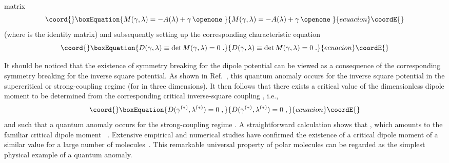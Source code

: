 \documentclass[a4paper,twocolumn,
showpacs,amssymb,aps,prl,superscriptaddress]{revtex4}%
\begin{document}
matrix
\begin{equation}\coord{}\boxEquation{
M(\gamma, \lambda) = - A(\lambda) + \gamma  \, \openone \; 
}{
M(\gamma, \lambda) = - A(\lambda) + \gamma  \, \openone \; 
}{ecuacion}\coordE{}\end{equation}
(where \myHighlight{$\openone$}\coordHE{} is the identity matrix)
and subsequently setting up
the corresponding characteristic 
equation~\cite{lev:67,bro:67,cra:67}
\begin{equation}\coord{}\boxEquation{
D(\gamma, \lambda) \equiv \det M (\gamma,\lambda) 
= 0 
\; .
 \label{eq:determinant}
}{
D(\gamma, \lambda) \equiv \det M (\gamma,\lambda) 
= 0 
\; .
 }{ecuacion}\coordE{}\end{equation}

It should be noticed that the existence of symmetry breaking for
the dipole potential can be
viewed as a consequence of the corresponding symmetry breaking for
the inverse square potential.
As shown in Ref.~\cite{cam:00}, this quantum anomaly 
occurs for the inverse square potential in the supercritical
or strong-coupling regime \coordHE{}
(for \coordHE{} in three dimensions).
It then follows that there exists
a critical value \myHighlight{$\lambda^{(*)}$}\coordHE{}
of the dimensionless dipole moment 
to be determined from the corresponding critical inverse-square coupling
\coordHE{}, i.e.,
\begin{equation}\coord{}\boxEquation{
D(\gamma^{(*)},\lambda^{(*)}) =0 \; ,
\label{eq:critical_characteristic_equation}
}{
D(\gamma^{(*)},\lambda^{(*)}) =0 \; ,
}{ecuacion}\coordE{}\end{equation}
and such that a quantum anomaly occurs for 
the strong-coupling regime \myHighlight{$ \lambda \geq \lambda^{(*)}$}\coordHE{}.
A straightforward calculation
shows that 
\coordHE{},
which amounts to the familiar critical dipole moment \coordHE{}~\cite{fer:47,wig:49,lev:67,bro:67,cra:67}. Extensive
empirical and numerical studies have confirmed the existence of a
critical dipole moment of a similar value for a large number of
molecules~\cite{mea:84,des:94}. This remarkable universal property
of polar molecules can be regarded as the simplest physical
example of a quantum anomaly.
\end{document}
